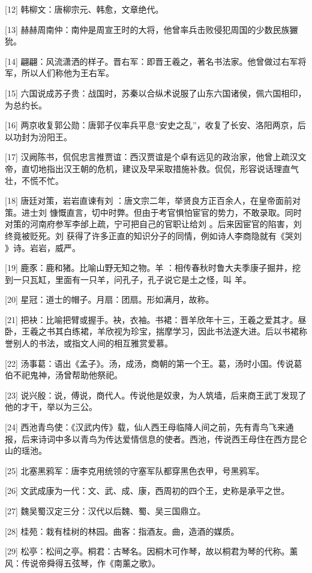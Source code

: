 \documentclass[12pt,UTF8]{ctexbook}
\begin{document}
[12] 韩柳文：唐柳宗元、韩愈，文章绝代。

[13] 赫赫周南仲：南仲是周宣王时的大将，他曾率兵击败侵犯周国的少数民族玁狁。

[14] 翩翩：风流潇洒的样子。晋右军：即晋王羲之，著名书法家。他曾做过右军将军，所以人们称他为王右军。

[15] 六国说成苏子贵：战国时，苏秦以合纵术说服了山东六国诸侯，佩六国相印，为总约长。

[16] 两京收复郭公勋：唐郭子仪率兵平息“安史之乱”，收复了长安、洛阳两京，后以功封为汾阳王。

[17] 汉阙陈书，侃侃忠言推贾谊：西汉贾谊是个卓有远见的政治家，他曾上疏汉文帝，直切地指出汉王朝的危机，建议及早采取措施补救。侃侃，形容说话理直气壮，不慌不忙。

[18] 唐廷对策，岩岩直谏有刘 ：唐文宗二年，举贤良方正百余人，在皇帝面前对策。进士刘 慷慨直言，切中时弊。但由于考官惧怕宦官的势力，不敢录取。同时对策的河南府参军李邰上疏，宁可把自己的官职让给刘 。后来因宦官的陷害，刘 终竟被贬死。刘 获得了许多正直的知识分子的同情，例如诗人李商隐就有《哭刘 》诗。岩岩，威严。

[19] 鹿豕：鹿和猪。比喻山野无知之物。羊 ：相传春秋时鲁大夫季康子掘井，挖到一只瓦缸，里面有一只羊，问孔子，孔子说它是土之怪，叫 羊。

[20] 星冠：道士的帽子。月扇：团扇。形如满月，故称。

[21] 把袂：比喻把臂或握手。袂，衣袖。书裙：晋羊欣年十三，王羲之爱其才。昼卧，王羲之书其白练裙，羊欣视为珍宝，揣摩学习，因此书法遂大进。后以书裙称誉别人的书法，或指文人间的相互雅赏爱慕。

[22] 汤事葛：语出《孟子》。汤，成汤，商朝的第一个王。葛，汤时小国。传说葛伯不祀鬼神，汤曾帮助他祭祀。

[23] 说兴殷：说，傅说，商代人。传说他是奴隶，为人筑墙，后来商王武丁发现了他的才干，举以为三公。

[24] 西池青鸟使：《汉武内传》载，仙人西王母临降人间之前，先有青鸟飞来通报，后来诗词中多以青鸟为传达爱情信息的使者。西池，传说西王母住在西方昆仑山的瑶池。

[25] 北塞黑鸦军：唐李克用统领的守塞军队都穿黑色衣甲，号黑鸦军。

[26] 文武成康为一代：文、武、成、康，西周初的四个王，史称是承平之世。

[27] 魏吴蜀汉定三分：汉代以后魏、蜀、吴三国鼎立。

[28] 桂苑：栽有桂树的林园。曲客：指酒友。曲，造酒的媒质。

[29] 松亭：松间之亭。桐君：古琴名。因桐木可作琴，故以桐君为琴的代称。薰风：传说帝舜得五弦琴，作《南薰之歌》。
\end{document}

